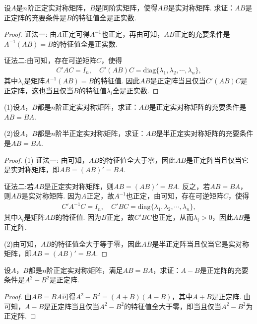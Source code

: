 \documentclass[../../main.tex]{subfiles}%
\begin{document}
\begin{proposition}\label{proposition:例9.66}
设\(A\)是\(n\)阶正定实对称矩阵，\(B\)是同阶实矩阵，使得\(AB\)是实对称矩阵. 求证：\(AB\)是正定阵的充要条件是\(B\)的特征值全是正实数.
\end{proposition}
\begin{proof}

{\color{blue}证法一:}
由\(A\)正定可得\(A^{-1}\)也正定，再由可知，\(AB\)正定的充要条件是\(A^{-1}(AB) = B\)的特征值全是正实数.

{\color{blue}证法二:}由可知，存在可逆矩阵\(C\)，使得
\begin{align*}
C'AC = I_n,\quad C'(AB)C = \mathrm{diag}\{\lambda_1,\lambda_2,\cdots,\lambda_n\},
\end{align*}
其中\(\lambda_i\)是矩阵\(A^{-1}(AB)=B\)的特征值. 因此\(AB\)是正定阵当且仅当\(C'(AB)C\)是正定阵，这也当且仅当\(B\)的特征值\(\lambda_i\)全是正实数.
\end{proof}

\begin{proposition}\label{proposition:例9.67}
(1)设\(A\)，\(B\)都是\(n\)阶正定实对称矩阵，求证：\(AB\)是正定实对称矩阵的充要条件是\(AB = BA\).

(2)设\(A\)，\(B\)都是\(n\)阶半正定实对称矩阵，求证：\(AB\)是半正定实对称矩阵的充要条件是\(AB = BA\).
\end{proposition}
\begin{proof}
(1)
{\color{blue}证法一:}
由可知，\(AB\)的特征值全大于零，因此\(AB\)是正定阵当且仅当它是实对称矩阵，即\(AB = (AB)' = BA\).

{\color{blue}证法二:}若\(AB\)是正定实对称矩阵，则\(AB=(AB)' = BA\). 反之，若\(AB = BA\)，则\(AB\)是实对称矩阵. 因为\(A\)正定，故\(A^{-1}\)也正定，由可知，存在可逆矩阵\(C\)，使得
\begin{align*}
C'A^{-1}C = I_n,\quad C'BC = \mathrm{diag}\{\lambda_1,\lambda_2,\cdots,\lambda_n\},
\end{align*}
其中\(\lambda_i\)是矩阵\(AB\)的特征值. 因为\(B\)正定，故\(C'BC\)也正定，从而\(\lambda_i>0\)，因此\(AB\)是正定阵. 

(2)由可知，\(AB\)的特征值全大于等于零，因此\(AB\)是半正定阵当且仅当它是实对称矩阵，即\(AB=(AB)' = BA\). 
\end{proof}

\begin{proposition}\label{proposition:例9.68}
设\(A\)，\(B\)都是\(n\)阶正定实对称矩阵，满足\(AB = BA\)，求证：\(A - B\)是正定阵的充要条件是\(A^2 - B^2\)是正定阵.
\end{proposition}
\begin{proof}
由\(AB = BA\)可得\(A^2 - B^2 = (A + B)(A - B)\)，其中\(A + B\)是正定阵. 由可知，\(A - B\)是正定阵当且仅当\(A^2 - B^2\)的特征值全大于零，即当且仅当\(A^2 - B^2\)为正定阵.
\end{proof}
\end{document}
